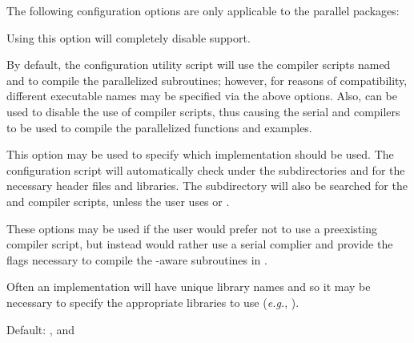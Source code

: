 
\vspace{0.25in}
\noindent The following configuration options are only applicable to the parallel {\sundials} packages:

\begin{config}
  
\item {}

  Using this option will completely disable {\mpi} support.

\item {}
\item {}

  By default, the configuration utility script will use the {\mpi} compiler
  scripts named  and  to compile the parallelized
  {\sundials} subroutines; however, for reasons of compatibility, different
  executable names may be specified via the above options. Also, 
  can be used to disable the use of {\mpi} compiler scripts, thus causing
  the serial {\C} and {\F} compilers to be used to compile the parallelized
  {\sundials} functions and examples.

\item {}

  This option may be used to specify which {\mpi} implementation should be used.
  The {\sundials} configuration script will automatically check under the
  subdirectories  and  for the necessary
  header files and libraries. The subdirectory  will also be
  searched for the {\C} and {\F} {\mpi} compiler scripts, unless the user uses
   or .

\item {}
\item {}
\item {}

  These options may be used if the user would prefer not to use a preexisting
  {\mpi} compiler script, but instead would rather use a serial complier and
  provide the flags necessary to compile the {\mpi}-aware subroutines in
  {\sundials}.

  Often an {\mpi} implementation will have unique library names and so it may
  be necessary to specify the appropriate libraries to use ({\em e.g.},
  ).

  Default: ,  and 

\end{config}

